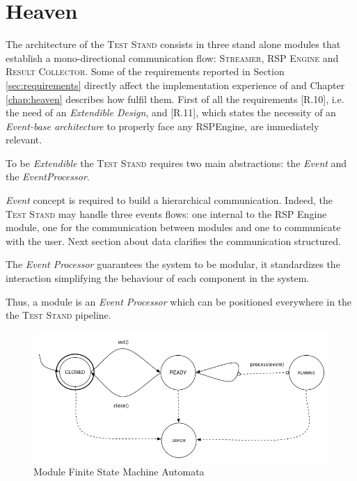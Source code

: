 \section{Heaven}\label{sec:impl-intro}

The architecture of the \textsc{Test Stand} consists in three stand alone modules that establish a mono-directional communication flow: \textsc{Streamer}, \textsc{RSP Engine} and \textsc{Result Collector}. Some of the requirements reported in Section \ref{sec:requirements} directly affect the implementation experience of \name and Chapter \ref{chap:heaven} describes how fulfil them. First of all the requirements [R.10], i.e. the need of an \textit{Extendible Design}, and [R.11], which states the necessity of an \textit{Event-base architecture} to properly face any RSPEngine, are immediately relevant. 

To be \textit{Extendible} the \textsc{Test Stand} requires two main abstractions: the \textit{Event} and the \textit{EventProcessor}.

\textit{Event} concept is required to build a hierarchical communication. Indeed, the \textsc{Test Stand} may handle three events flows: one internal to the RSP Engine module, one for the communication between modules and one to communicate with the user. Next section about data clarifies the communication structured. 

The \textit{Event Processor} guarantees the system to be modular, it standardizes the interaction simplifying the behaviour of each component in the system. 

Thus, a module is an \textit{Event Processor} which can be positioned everywhere in the the \textsc{Test Stand} pipeline. %

\begin{figure}[tbh]
  \centering
	\includegraphics[width=\linewidth]{images/fsm-schema}
	\caption{Module Finite State Machine Automata} 
  	\label{fig:module-fsm}
\end{figure}


